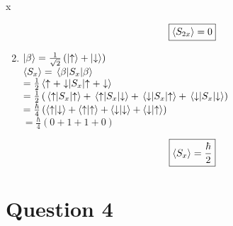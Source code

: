 x\documentclass[12pt]{article}
\begin{document}
\begin{enumerate}[label=\alph*)]
\[\boxed{\ev{S_{2x}} = 0}\]

\item
$\ket{\beta} = \frac{1}{\sqrt{2}}\left(\ket{\uparrow} + \ket{\downarrow}\right)$\vspace{0.5em}\\
$\ev{S_x} = \ev{S_x}{\beta}$\vspace{0.5em}\\
\hspace*{1.9em} $ = \frac{1}{2}\ev{S_x}{\uparrow + \downarrow}$\vspace{0.5em}\\
\hspace*{1.9em} $ = \frac{1}{2}\left(\ev{S_x}{\uparrow} + \mel{\uparrow}{S_x}{\downarrow} + \mel{\downarrow}{S_x}{\uparrow} + \ev{S_x}{\downarrow}\right) $\vspace{0.5em}\\
\hspace*{1.9em} $ = \frac{\hbar}{4} \left(\braket{\uparrow}{\downarrow} + \braket{\uparrow}{\uparrow} + \braket{\downarrow}{\downarrow} + \braket{\downarrow}{\uparrow}\right)$\vspace{0.5em}\\
\hspace*{1.9em} $= \frac{\hbar}{4}\left(0+1+1+0\right)$\vspace{0.5em}

\[\boxed{\ev{S_x} = \frac{\hbar}{2}}\]

\end{enumerate}

\newpage

\section*{Question 4}
\end{document}
